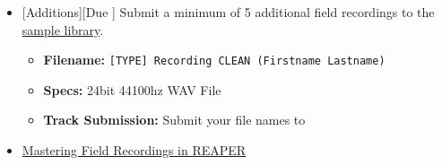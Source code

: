 \begin{itemize}[noitemsep,topsep=0pt,leftmargin=*]
\begin{itemize}
	      \end{itemize}
	\item {}[Additions][Due \dSun] \newline
	      Submit a minimum of 5 additional field recordings to the \href{\samplelibPermURL}{sample library}.
	      \begin{itemize}
		      \item \textbf{Filename:} \texttt{[TYPE] Recording CLEAN (Firstname Lastname)}
		      \item \textbf{Specs:} 24bit 44100hz WAV File
		      \item \textbf{Track Submission:} Submit your file names to \discordS
	      \end{itemize}
	\item {} \href{https://www.youtube.com/watch?v=7BfWqRapF5E}{Mastering Field Recordings in REAPER}
\end{itemize}